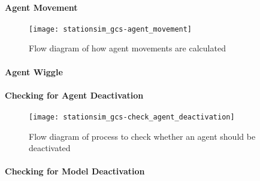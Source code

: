\paragraph{Agent Movement}\label{para:submodels:agent_movement}

\begin{figure}[h]
    \centering
    \texttt{[image: stationsim\_gcs-agent\_movement]}
    \caption{Flow diagram of how agent movements are calculated}
    \label{fig:flow:agent_movement}
\end{figure}

\paragraph{Agent Wiggle}\label{para:submodels:agent_wiggle}

\paragraph{Checking for Agent
Deactivation}\label{para:submodels:agent_deactivation}

\begin{figure}[h]
    \centering
    \texttt{[image: stationsim\_gcs-check\_agent\_deactivation]}
    \caption{Flow diagram of process to check whether an agent should be
    deactivated}
    \label{fig:flow:check_agent_deactivation}
\end{figure}

\paragraph{Checking for Model
Deactivation}\label{para:submodels:model_deactivation}

